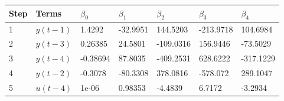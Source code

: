 \begin{tabular}{lllllll}
Step & Terms & $\beta_{0}$ & $\beta_{1}$ & $\beta_{2}$ & $\beta_{3}$ & $\beta_{4}$ \\ 
\hline 
1 & $y(t-1)$ & 1.4292 & -32.9951 & 144.5203 & -213.9718 & 104.6984 \\ 
2 & $y(t-3)$ & 0.26385 & 24.5801 & -109.0316 & 156.9446 & -73.5029 \\ 
3 & $y(t-4)$ & -0.38694 & 87.8035 & -409.2531 & 628.6222 & -317.1229 \\ 
4 & $y(t-2)$ & -0.3078 & -80.3308 & 378.0816 & -578.072 & 289.1047 \\ 
5 & $u(t-4)$ & 1e-06 & 0.98353 & -4.4839 & 6.7172 & -3.2934 \\ 
\hline 
\end{tabular}